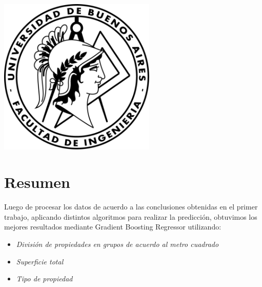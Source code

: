 \documentclass[a4paper, 10pt]{article}
\begin{document}
    \newpage

    \begin{center}
        \includegraphics[width=7.5cm, height=7.5cm]{images/logo}
    \end{center}


    \maketitle
    \newpage
    \tableofcontents
    \newpage
	\section{Resumen}
	
		Luego de procesar los datos de acuerdo a las conclusiones obtenidas en el primer trabajo, aplicando distintos algoritmos para realizar la predicción, obtuvimos los mejores resultados mediante Gradient Boosting Regressor utilizando:
		\begin{itemize}
		
		\item \emph{División de propiedades en grupos de acuerdo al metro cuadrado}
			
		\item \emph{Superficie total}

		\item \emph{Tipo de propiedad} 
			
		\end{itemize}
		
\end{document}
